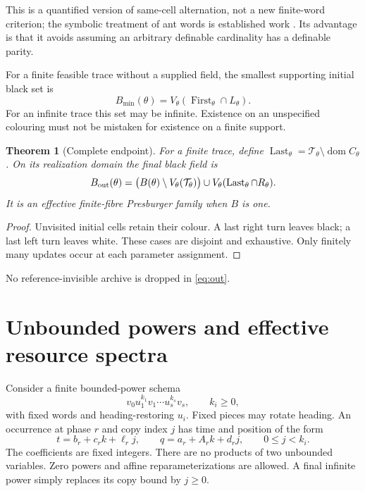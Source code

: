 \documentclass[11pt]{article}
\newtheorem{theorem}{Theorem}[section]
\theoremstyle{remark}\newtheorem{remark}[theorem]{Remark}
\newcommand{\dom}{\operatorname{dom}}\newcommand{\ran}{\operatorname{ran}}
\begin{document}
This is a quantified version of same-cell alternation, not a new finite-word
criterion; the symbolic treatment of ant words is established work
\cite{gajardo}. Its advantage is that it avoids assuming an arbitrary definable
cardinality has a definable parity.

For a finite feasible trace without a supplied field, the smallest supporting
initial black set is
\begin{equation}\label{eq:root}
 B_{\min}(\theta)=V_\theta(\operatorname{First}_\theta\cap L_\theta).
\end{equation}
For an infinite trace this set may be infinite. Existence on an unspecified
colouring must not be mistaken for existence on a finite support.

\begin{theorem}[Complete endpoint]\label{thm:output}
For a finite trace, define
$\operatorname{Last}_\theta=\mathcal T_\theta\setminus\dom C_\theta$.
On its realization domain the final black field is
\begin{equation}\label{eq:out}
 B_{\rm out}(\theta)=
 \bigl(B(\theta)\setminus V_\theta(\mathcal T_\theta)\bigr)
 \cup V_\theta(\operatorname{Last}_\theta\cap R_\theta).
\end{equation}
It is an effective finite-fibre Presburger family when $B$ is one.
\end{theorem}
\begin{proof}
Unvisited initial cells retain their colour. A last right turn leaves black;
a last left turn leaves white. These cases are disjoint and exhaustive. Only
finitely many updates occur at each parameter assignment.
\end{proof}
No reference-invisible archive is dropped in \eqref{eq:out}.

\section{Unbounded powers and effective resource spectra}\label{sec:power}
Consider a finite bounded-power schema
\begin{equation}\label{eq:schema}
 v_0u_1^{k_1}v_1\cdots u_s^{k_s}v_s,\qquad k_i\ge0,
\end{equation}
with fixed words and heading-restoring $u_i$. Fixed pieces may rotate heading.
An occurrence at phase $r$ and copy index $j$ has time and position of the form
\begin{equation}\label{eq:affine}
 t=b_r+c_r k+\ell_r j,\qquad q=a_r+A_r k+d_r j,
 \qquad 0\le j<k_i.
\end{equation}
The coefficients are fixed integers. There are no products of two unbounded
variables. Zero powers and affine reparameterizations are allowed. A final
infinite power simply replaces its copy bound by $j\ge0$.
\end{document}
